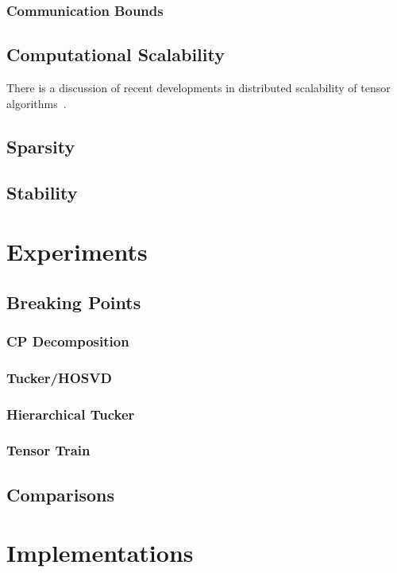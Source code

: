 \documentclass[10pt]{article}
\begin{document}
\subsubsection{Communication Bounds}
\subsection{Computational Scalability}
There is a discussion of recent developments in distributed scalability of tensor algorithms~\cite{falbull}.
\subsection{Sparsity}
\subsection{Stability}
\section{Experiments}
\subsection{Breaking Points}
\subsubsection{CP Decomposition}
\subsubsection{Tucker/HOSVD}
\subsubsection{Hierarchical Tucker}
\subsubsection{Tensor Train}
\subsection{Comparisons}
\section{Implementations}
\end{document}
